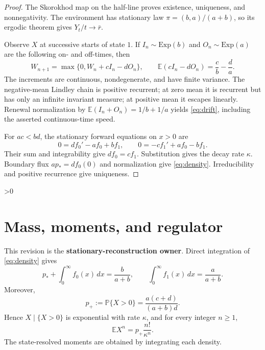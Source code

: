 \documentclass[10pt]{article}
\providecommand{\CRevisionRound}{2}
\newcommand{\E}{\mathbb E}
\newcommand{\Pp}{\mathbb P}
\begin{document}
\begin{proof}
The Skorokhod map on the half-line proves existence, uniqueness, and
nonnegativity.  The environment has stationary law
$\pi=(b,a)/(a+b)$, so its ergodic theorem gives $Y_t/t\to\bar r$.

Observe $X$ at successive starts of state $1$.  If $I_n\sim\mathrm{Exp}(b)$
and $O_n\sim\mathrm{Exp}(a)$ are the following on- and off-times, then
\begin{equation}\label{eq:lindley}
 W_{n+1}=\max\{0,W_n+cI_n-dO_n\},\qquad
 \E(cI_n-dO_n)=\frac cb-\frac da.
\end{equation}
The increments are continuous, nondegenerate, and have finite variance.
The negative-mean Lindley chain is positive recurrent; at zero mean it is
recurrent but has only an infinite invariant measure; at positive mean it
escapes linearly.  Renewal normalization by
$\E(I_n+O_n)=1/b+1/a$ yields \eqref{eq:drift}, including the asserted
continuous-time speed.

For $ac<bd$, the stationary forward equations on $x>0$ are
\begin{equation}\label{eq:forward}
 0=d f_0'-a f_0+b f_1,\qquad
 0=-c f_1'+a f_0-b f_1.
\end{equation}
Their sum and integrability give $d f_0=c f_1$.  Substitution gives the
decay rate $\kappa$.  Boundary flux $ap_*=df_0(0)$ and normalization give
\eqref{eq:density}.  Irreducibility and positive recurrence give uniqueness.
\end{proof}

\ifnum\CRevisionRound>0
\section{Mass, moments, and regulator}
This revision is the \textbf{stationary-reconstruction owner}.  Direct
integration of \eqref{eq:density} gives
\begin{equation}\label{eq:marg}
 p_*+\int_0^\infty f_0(x)\,dx=\frac b{a+b},\qquad
 \int_0^\infty f_1(x)\,dx=\frac a{a+b}.
\end{equation}
Moreover,
\begin{equation}\label{eq:positive}
 p_+:=\Pp\{X>0\}=\frac{a(c+d)}{(a+b)d}.
\end{equation}
Hence $X\mid\{X>0\}$ is exponential with rate $\kappa$, and for every
integer $n\ge1$,
\begin{equation}\label{eq:moments}
 \E X^n=p_+\frac{n!}{\kappa^n}.
\end{equation}
The state-resolved moments are obtained by integrating each density.
\end{document}
